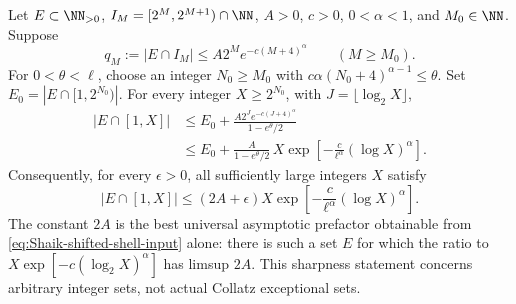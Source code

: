 \begin{proposition}
\label{prop:Shaik-sharp-shell}
Let \(E\subset\NN_{>0}\), \(I_M=[2^M,2^{M+1})\cap\NN\),
\(A>0\), \(c>0\), \(0<\alpha<1\), and \(M_0\in\NN\). Suppose
\begin{equation}\label{eq:Shaik-shifted-shell-input}
 q_M:=|E\cap I_M|\le A2^M e^{-c(M+4)^\alpha}
 \qquad(M\ge M_0).
\end{equation}
For \(0<\theta<\ell\), choose an integer \(N_0\ge M_0\) with
\(c\alpha(N_0+4)^{\alpha-1}\le\theta\).
Set \(E_0=|E\cap[1,2^{N_0})|\). For every integer \(X\ge2^{N_0}\),
with \(J=\lfloor\log_2X\rfloor\),
\begin{align}
 |E\cap[1,X]|
 &\le E_0+
 \frac{A2^J e^{-c(J+4)^\alpha}}{1-e^\theta/2}\nonumber\\
 &\le E_0+\frac{A}{1-e^\theta/2}\,
 X\exp\left[-\frac{c}{\ell^\alpha}(\log X)^\alpha\right].
 \label{eq:Shaik-sharp-shell-finite}
\end{align}
Consequently, for every \(\epsilon>0\), all sufficiently large
integers \(X\) satisfy
\begin{equation}\label{eq:Shaik-sharp-shell-asymptotic}
 |E\cap[1,X]|\le(2A+\epsilon)X
 \exp\left[-\frac{c}{\ell^\alpha}(\log X)^\alpha\right].
\end{equation}
The constant \(2A\) is the best universal asymptotic prefactor obtainable
from \eqref{eq:Shaik-shifted-shell-input} alone: there is such a set
\(E\) for which the ratio to
\(X\exp[-c(\log_2X)^\alpha]\) has limsup \(2A\).
This sharpness statement concerns arbitrary integer sets, not actual
Collatz exceptional sets.
\end{proposition}
